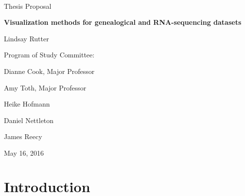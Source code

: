 \documentclass[11pt,a4paper,oldfontcommands,openany]{memoir}
\numberwithin{equation}{section} %
\begin{document}
\sloppy


{
\centering
~\vspace{\fill}

\vspace{2.5cm}

{\LARGE Thesis Proposal}

\vspace{1cm}

{\LARGE\textbf{Visualization methods for genealogical and RNA-sequencing datasets}}

\vspace{1cm}

{\LARGE Lindsay Rutter}

\vspace{4cm}

{\LARGE Program of Study Committee:}

\vspace{1cm}

{\LARGE Dianne Cook, Major Professor}

\vspace{.25cm}

{\LARGE Amy Toth, Major Professor}

\vspace{.25cm}

{\LARGE Heike Hofmann}

\vspace{.25cm}

{\LARGE Daniel Nettleton}

\vspace{.25cm}

{\LARGE James Reecy}

\vspace{2.5cm}

{\centerline{\large May 16, 2016}}
}

\clearpage

\setsecheadstyle{\Large\bfseries\sffamily\raggedright}
\setsubsecheadstyle{\large\bfseries\sffamily\raggedright}
\setsubsubsecheadstyle{\bfseries\sffamily\raggedright}

\tableofcontents

\setlength{\parskip}{10pt} %

\OnehalfSpacing

\chapter{Introduction}
\end{document}

